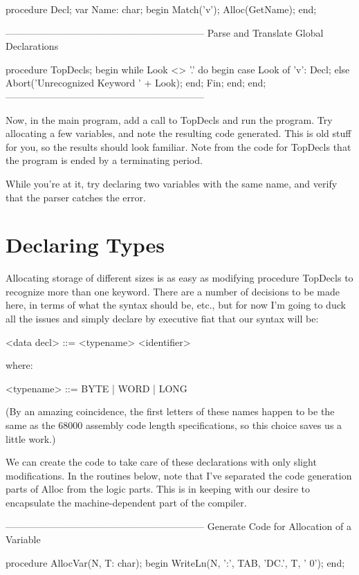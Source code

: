 \documentclass[float=false, crop=false]{standalone}
\begin{document}
procedure Decl;
var Name: char;
begin
   Match('v');
   Alloc(GetName);
end;


{--------------------------------------------------------------}
{ Parse and Translate Global Declarations }

procedure TopDecls;
begin
   while Look <> '.' do begin
      case Look of
        'v': Decl;
      else Abort('Unrecognized Keyword ' + Look);
      end;
      Fin;
   end;
end;
{--------------------------------------------------------------}


Now, in the main program, add a call to TopDecls and run the program. Try
allocating a few variables, and note the resulting code generated. This is old
stuff for you, so the results should look familiar. Note from the code for
TopDecls that the program is ended by a terminating period.

While you're at it, try declaring two variables with the same name, and verify
that the parser catches the error.


\section{Declaring Types}


Allocating storage of different sizes is as easy as modifying procedure TopDecls
to recognize more than one keyword. There are a number of decisions to be made
here, in terms of what the syntax should be, etc., but for now I'm going to duck
all the issues and simply declare by executive fiat that our syntax will be:


     <data decl> ::= <typename>  <identifier>

where:


     <typename> ::= BYTE | WORD | LONG


(By an amazing coincidence, the first letters of these names happen to be the
same as the 68000 assembly code length specifications, so this choice saves us a
little work.)

We can create the code to take care of these declarations with only slight
modifications. In the routines below, note that I've separated the code
generation parts of Alloc from the logic parts. This is in keeping with our
desire to encapsulate the machine-dependent part of the compiler.


{--------------------------------------------------------------}
{ Generate Code for Allocation of a Variable }

procedure AllocVar(N, T: char);
begin
   WriteLn(N, ':', TAB, 'DC.', T, ' 0');
end;
\end{document}
